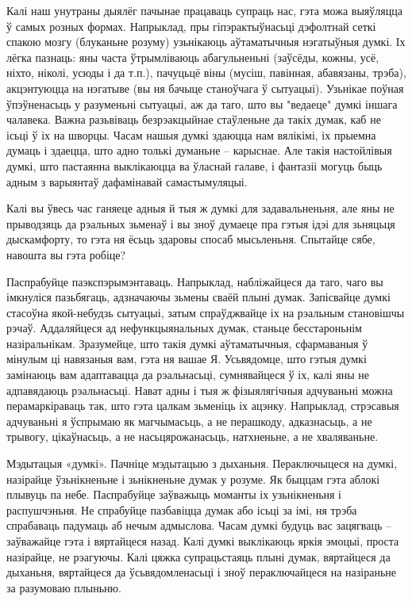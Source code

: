 Калі наш унутраны дыялёг пачынае працаваць супраць нас, гэта можа выяўляцца ў самых розных формах. Напрыклад, пры гіпэрактыўнасьці дэфолтнай сеткі спакою мозгу (блуканьне розуму) узьнікаюць аўтаматычныя нэгатыўныя думкі. Іх лёгка пазнаць: яны часта ўтрымліваюць абагульненьні (заўсёды, кожны, усё, ніхто, ніколі, усюды і да т.п.), пачуцьцё віны (мусіш, павінная, абавязаны, трэба), акцэнтуюцца на нэгатыве (вы ня бачыце станоўчага ў сытуацыі). Узьнікае поўная ўпэўненасьць у разуменьні сытуацыі, аж да таго, што вы "ведаеце" думкі іншага чалавека. Важна разьвіваць безрэакцыйнае стаўленьне да такіх думак, каб не ісьці ў іх на шворцы. Часам нашыя думкі здаюцца нам вялікімі, іх прыемна думаць і здаецца, што адно толькі думаньне – карыснае. Але такія настойлівыя думкі, што пастаянна выклікаюцца ва ўласнай галаве, і фантазіі могуць быць адным з варыянтаў дафамінавай самастымуляцыі. 

Калі вы ўвесь час ганяеце адныя й тыя ж думкі для задавальненьня, але яны не прыводзяць да рэальных зьменаў і вы зноў думаеце пра гэтыя ідэі для зьняцьця дыскамфорту, то гэта ня ёсьць здаровы спосаб мысьленьня. Спытайце сябе, навошта вы гэта робіце?

Паспрабуйце паэкспэрымэнтаваць. Напрыклад, набліжайцеся да таго, чаго вы імкнуліся пазьбягаць, адзначаючы зьмены сваёй плыні думак. Запісвайце думкі стасоўна якой-небудзь сытуацыі, затым спраўджвайце іх на рэальным становішчы рэчаў. Аддаляйцеся ад нефункцыянальных думак, станьце бесстароньнім назіральнікам. Зразумейце, што такія думкі аўтаматычныя, сфармаваныя ў мінулым ці навязаныя вам, гэта ня вашае Я. Усьвядомце, што гэтыя думкі замінаюць вам адаптавацца да рэальнасьці, сумнявайцеся ў іх, калі яны не адпавядаюць рэальнасьці. Нават адны і тыя ж фізыялягічныя адчуваньні можна перамаркіраваць так, што гэта цалкам зьменіць іх ацэнку. Напрыклад, стрэсавыя адчуваньні я ўспрымаю як магчымасьць, а не перашкоду, адказнасьць, а не трывогу, цікаўнасьць, а не насьцярожанасьць, натхненьне, а не хваляваньне.

Мэдытацыя «думкі». Пачніце мэдытацыю з дыханьня. Пераключыцеся на думкі, назірайце ўзьнікненьне і зьнікненьне думак у розуме. Як быццам гэта аблокі плывуць па небе. Паспрабуйце заўважыць моманты іх узьнікненьня і распушчэньня. Не спрабуйце пазбавіцца думак або ісьці за імі, ня трэба спрабаваць падумаць аб нечым адмыслова. Часам думкі будуць вас зацягваць – заўважайце гэта і вяртайцеся назад. Калі думкі выклікаюць яркія эмоцыі, проста назірайце, не рэагуючы. Калі цяжка супрацьстаяць плыні думак, вяртайцеся да дыханьня, вяртайцеся да ўсьвядомленасьці і зноў пераключайцеся на назіраньне за разумоваю плыньню.


